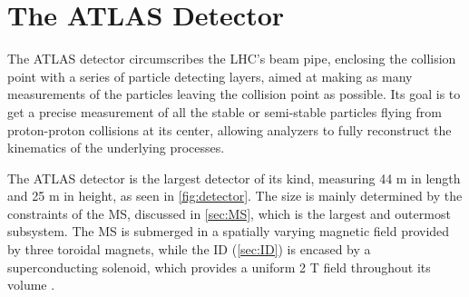 
\chapter{The ATLAS Detector} %

\label{ch:atlas} %

The ATLAS detector circumscribes the \ac{LHC}'s beam pipe, enclosing the collision point with a series of particle detecting layers, aimed at making as many measurements of the particles leaving the collision point as possible. Its goal is to get a precise measurement of all the stable or semi-stable particles flying from proton-proton collisions at its center, allowing analyzers to fully reconstruct the kinematics of the underlying processes.

The ATLAS detector is the largest detector of its kind, measuring 44 m in length and 25 m in height, as seen in \autoref{fig:detector}. The size is mainly determined by the constraints of the \ac{MS}, discussed in \autoref{sec:MS}, which is the largest and outermost subsystem. The \ac{MS} is submerged in a spatially varying magnetic field provided by three toroidal magnets, while the \ac{ID} (\autoref{sec:ID}) is encased by a superconducting solenoid, which provides a uniform 2 T field throughout its volume \cite{PERF-2007-01}.

